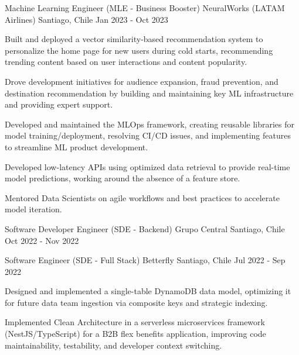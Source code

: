 \cventry
{Machine Learning Engineer (MLE - Business Booster)}
{NeuralWorks (LATAM Airlines)}
{Santiago, Chile}
{Jan 2023 - Oct 2023}   
{
\begin{cvitems}
    \item Built and deployed a vector similarity-based recommendation system to personalize the home page for new users during cold starts, recommending trending content based on user interactions and content popularity.
    \item Drove development initiatives for audience expansion, fraud prevention, and destination recommendation by building and maintaining key ML infrastructure and providing expert support.
    \item Developed and maintained the MLOps framework, creating reusable libraries for model training/deployment, resolving CI/CD issues, and implementing features to streamline ML product development.
    \item Developed low-latency APIs using optimized data retrieval to provide real-time model predictions, working around the absence of a feature store.
    \item Mentored Data Scientists on agile workflows and best practices to accelerate model iteration.
\end{cvitems}
}

\cventry
{Software Developer Engineer (SDE - Backend)}
{Grupo Central}
{Santiago, Chile}
{Oct 2022 - Nov 2022}
{}

\cventry
{Software Engineer (SDE - Full Stack)}
{Betterfly}
{Santiago, Chile}
{Jul 2022 - Sep 2022}
{
\begin{cvitems}
    \item Designed and implemented a single-table DynamoDB data model, optimizing it for future data team ingestion via composite keys and strategic indexing.
    \item Implemented Clean Architecture in a serverless microservices framework (NestJS/TypeScript) for a B2B flex benefits application, improving code maintainability, testability, and developer context switching.
\end{cvitems}
}

